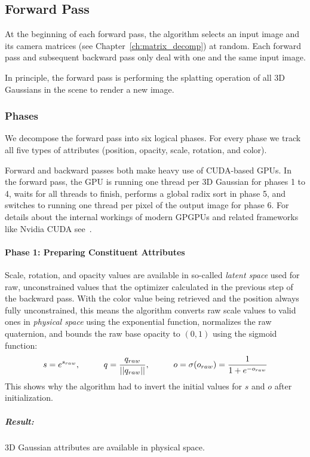 \subsection{Forward Pass}
\label{ch:forwardpass}
At the beginning of each forward pass, the algorithm selects an input image and its camera matrices (see Chapter~\ref{ch:matrix_decomp}) at random. Each forward pass and subsequent backward pass only deal with one and the same input image.

In principle, the forward pass is performing the splatting operation of all 3D Gaussians in the scene to render a new image.

\subsubsection{Phases}
We decompose the forward pass into six logical phases. For every phase we track all five types of attributes (position, opacity, scale, rotation, and color). 

Forward and backward passes both make heavy use of CUDA-based GPUs. In the forward pass, the GPU is running one thread per 3D Gaussian for phases 1 to 4, waits for all threads to finish, performs a global radix sort in phase 5, and switches to running one thread per pixel of the output image for phase 6.
For details about the internal workings of modern GPGPUs and related frameworks like Nvidia CUDA see~\cite{oden2026APC}.

\vspace{-5pt}
\paragraph{Phase 1: Preparing Constituent Attributes} Scale, rotation, and opacity values are available in so-called \textit{latent space} used for raw, unconstrained values that the optimizer calculated in the previous step of the backward pass. With the color value being retrieved and the position always fully unconstrained, this means the algorithm converts raw scale values to valid ones in \textit{physical space} \cite{bengioRepresentationLearningReview2013} using the exponential function, normalizes the raw quaternion, and bounds the raw base opacity to $(0,1)$ using the sigmoid function:
\vspace{-5pt}
$$
s = e^{s_{raw}},
\hspace{1cm}
q = \frac{q_{raw}}{\vert{}\vert{}q_{raw}\vert{}\vert{}},
\hspace{1cm}
o = \sigma(o_{raw}) = \frac{1}{1 + e^{-o_{raw}}}
\vspace{-5pt} 
$$
This shows why the algorithm had to invert the initial values for $s$ and $o$ after initialization. 
\subparagraph{Result:} 3D Gaussian attributes are available in physical space.

